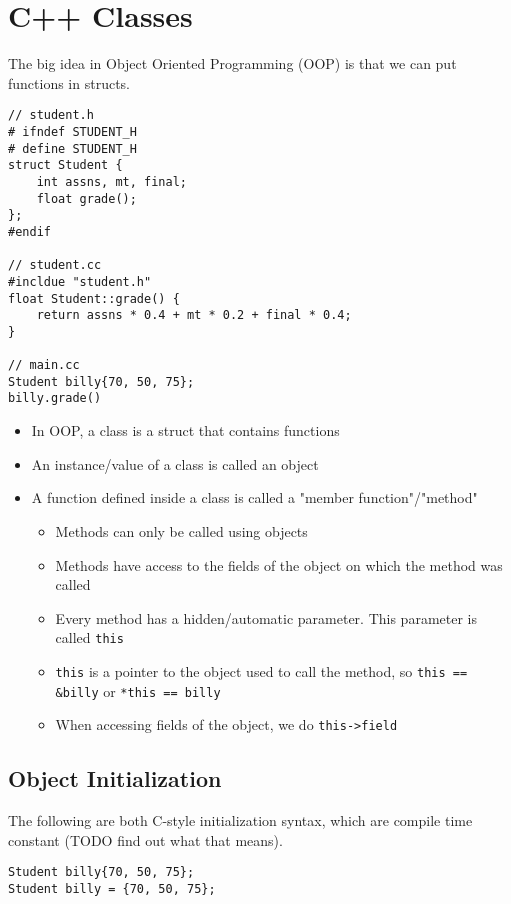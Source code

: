 \documentclass[12pt]{article}
\begin{document}
\section{C++ Classes}
The big idea in Object Oriented Programming (OOP) is that we can put functions in structs.

\begin{lstlisting}
// student.h
# ifndef STUDENT_H
# define STUDENT_H
struct Student {
    int assns, mt, final;
    float grade();
};
#endif

// student.cc
#incldue "student.h"
float Student::grade() {
    return assns * 0.4 + mt * 0.2 + final * 0.4;
}

// main.cc
Student billy{70, 50, 75};
billy.grade()
\end{lstlisting}

\begin{itemize}
    \item In OOP, a class is a struct that contains functions
    \item An instance/value of a class is called an object
    \item A function defined inside a class is called a "member function"/"method"
    \begin{itemize}
        \item Methods can only be called using objects
        \item Methods have access to the fields of the object on which the method was called
        \item Every method has a hidden/automatic parameter. This parameter is called \lstinline{this}
        \item \lstinline{this} is a pointer to the object used to call the method, so \lstinline{this == &billy} or \lstinline{*this == billy}
        \item When accessing fields of the object, we do \lstinline{this->field}
    \end{itemize}
\end{itemize}

\subsection{Object Initialization}
The following are both C-style initialization syntax, which are compile time constant (TODO find out what that means).
\begin{lstlisting}
Student billy{70, 50, 75};
Student billy = {70, 50, 75};
\end{lstlisting}
\end{document}
